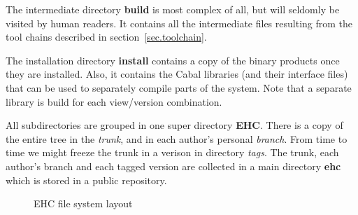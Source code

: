The intermediate directory {\bf build} is most complex of all,
but will seldomly be visited by human readers.
It contains all the intermediate files resulting from the tool chains described in section~\ref{sec.toolchain}.

The installation directory {\bf install} contains a copy of the binary products
once they are installed.
Also, it contains the Cabal libraries (and their interface files) that can be used to separately compile parts of the system.
Note that a separate library is build for each view/version combination.

All subdirectories are grouped in one super directory {\bf EHC}.
There is a copy of the entire tree in the {\em trunk}, and in each author's personal {\em branch}.
From time to time we might freeze the trunk in a verison in directory {\em tags}.
The trunk, each author's branch and each tagged version are collected in a main directory {\bf ehc}
which is stored in a public repository.

\begin{figure}[bp]
\caption{EHC file system layout}
\label{fig.files}
\end{figure}

















